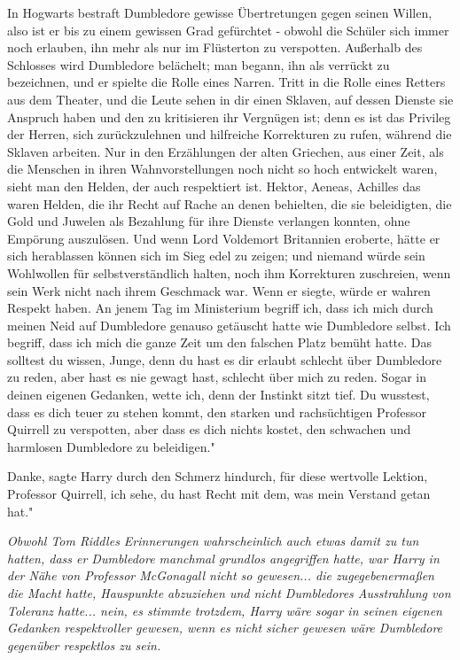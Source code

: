 \glqq In Hogwarts bestraft Dumbledore gewisse Übertretungen gegen seinen Willen,
also ist er bis zu einem gewissen Grad gefürchtet - obwohl die Schüler sich
immer noch erlauben, ihn mehr als nur im Flüsterton zu verspotten. Außerhalb des
Schlosses wird Dumbledore belächelt; man begann, ihn als verrückt zu bezeichnen,
und er spielte die Rolle eines Narren. Tritt in die Rolle eines Retters aus dem
Theater, und die Leute sehen in dir einen Sklaven, auf dessen Dienste sie
Anspruch haben und den zu kritisieren ihr Vergnügen ist; denn es ist das
Privileg der Herren, sich zurückzulehnen und hilfreiche Korrekturen zu rufen,
während die Sklaven arbeiten. Nur in den Erzählungen der alten Griechen, aus
einer Zeit, als die Menschen in ihren Wahnvorstellungen noch nicht so hoch
entwickelt waren, sieht man den Helden, der auch respektiert ist. Hektor,
Aeneas, Achilles das waren Helden, die ihr Recht auf Rache an denen behielten,
die sie beleidigten, die Gold und Juwelen als Bezahlung für ihre Dienste
verlangen konnten, ohne Empörung auszulösen. Und wenn Lord Voldemort Britannien
eroberte, hätte er sich herablassen können sich im Sieg edel zu zeigen; und
niemand würde sein Wohlwollen für selbstverständlich halten, noch ihm
Korrekturen zuschreien, wenn sein Werk nicht nach ihrem Geschmack war. Wenn er
siegte, würde er wahren Respekt haben. An jenem Tag im Ministerium begriff ich,
dass ich mich durch meinen Neid auf Dumbledore genauso getäuscht hatte wie
Dumbledore selbst. Ich begriff, dass ich mich die ganze Zeit um den falschen
Platz bemüht hatte. Das solltest du wissen, Junge, denn du hast es dir erlaubt
schlecht über Dumbledore zu reden, aber hast es nie gewagt hast, schlecht über
mich zu reden. Sogar in deinen eigenen Gedanken, wette ich, denn der Instinkt
sitzt tief. Du wusstest, dass es dich teuer zu stehen kommt, den starken und
rachsüchtigen Professor Quirrell zu verspotten, aber dass es dich nichts kostet,
den schwachen und harmlosen Dumbledore zu beleidigen."

\glqq Danke\grqq{}, sagte Harry durch den Schmerz hindurch, \glqq für diese
wertvolle Lektion, Professor Quirrell, ich sehe, du hast Recht mit dem, was mein
Verstand getan hat."

\emph{Obwohl Tom Riddles Erinnerungen wahrscheinlich auch etwas damit zu tun hatten, dass er Dumbledore manchmal grundlos angegriffen hatte, war Harry in der Nähe von Professor McGonagall nicht so gewesen... die zugegebenermaßen die Macht hatte, Hauspunkte abzuziehen und nicht Dumbledores Ausstrahlung von Toleranz hatte... nein, es stimmte trotzdem, Harry wäre sogar in seinen eigenen Gedanken respektvoller gewesen, wenn es nicht sicher gewesen wäre Dumbledore gegenüber respektlos zu sein. }

